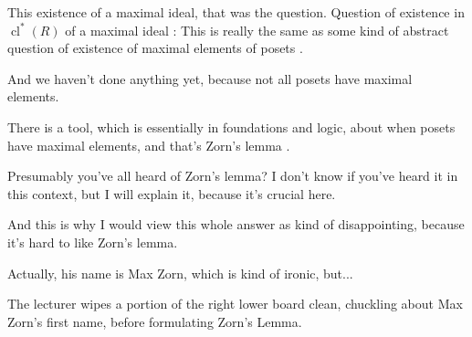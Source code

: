 \begin{content}
\begin{center}
\end{center}
\end{content}

\begin{speech}[00:34:33 - 00:36:33]
This existence of a maximal ideal, that was the question. Question of existence in $\operatorname{cl}^*(R)$ of a maximal ideal : This is really the same as some kind of abstract question of existence of maximal elements of posets .

And we haven't done anything yet, because not all posets have maximal elements.

There is a tool, which is essentially in foundations and logic, about when posets have maximal elements, and that's Zorn's lemma .

Presumably you've all heard of Zorn's lemma? I don't know if you've heard it in this context, but I will explain it, because it's crucial here.

And this is why I would view this whole answer as kind of disappointing, because it's hard to like Zorn's lemma. 

Actually, his name is Max Zorn, which is kind of ironic, but... 
\end{speech}

\begin{note}
The lecturer wipes a portion of the right lower board clean, chuckling about Max Zorn's first name, before formulating Zorn's Lemma.
\end{note}

